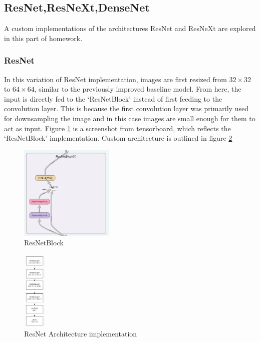 \documentclass[conference]{IEEEtran}
\begin{document}
		\subsection{ResNet,ResNeXt,DenseNet}
		A custom implementations of the architectures ResNet and ResNeXt are explored in this part of homework.
		\subsubsection{ResNet}
		In this variation of ResNet implementation, images are first resized from $32 \times 32$ to $64 \times 64$, similar to the previously improved baseline model. From here, the input is directly fed to the `ResNetBlock' instead of first feeding to the convolution layer. This is because the first convolution layer was primarily used for downsampling the image and in this case images are small enough for them to act as input. Figure \ref{fig:resnet_block} is a screenshot from tensorboard, which reflects the `ResNetBlock' implementation. Custom architecture is outlined in figure \ref{fig:resnet_architecture}
	
		\begin{figure}
			\centering
			\includegraphics[width=0.4\textwidth]{models/ResNetBlock.png}
			\caption{ResNetBlock}
			\label{fig:resnet_block}
		\end{figure}
		
		\begin{figure}
			\centering
			\includegraphics[width=0.1\textwidth]{models/ResNetModel.png}
			\caption{ResNet Architecture implementation}
			\label{fig:resnet_architecture}	
		\end{figure}
\end{document}
